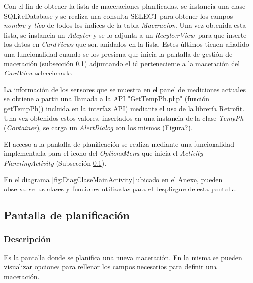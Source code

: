                Con el fin de obtener la lista de maceraciones planificadas, se instancia una clase SQLiteDatabase y se realiza una consulta SELECT para obtener los campos \textit{nombre} y \textit{tipo} de todos los índices de la tabla \textit{Maceracion}. Una vez obtenida esta lista, se instancia un \textit{Adapter} y se lo adjunta a un \textit{RecylcerView}, para que inserte los datos en \textit{CardViews} que son anidados en la lista. Estos últimos tienen añadido una funcionalidad cuando se los presiona que inicia la pantalla de gestión de maceración (subsección \ref{DescripPantallaPlanificación}) adjuntando el id perteneciente a la maceración del \textit{CardView} seleccionado.
                
                \par La información de los sensores que se muestra en el panel de mediciones actuales se obtiene a partir una llamada a la API "GetTempPh.php" (función getTempPh() incluida en la interfaz API) mediante el uso de la librería Retrofit. Una vez obtenidos estos valores, insertados en una instancia de la clase \textit{TempPh} (\textit{Container}), se carga un \textit{AlertDialog} con los mismos (Figura?).
                
                \par El acceso a la pantalla de planificación se realiza mediante una funcionalidad implementada para el icono del \textit{OptionsMenu} que inicia el \textit{Activity PlanningActivity} (Subsección \ref{DescripPantallaPlanificación}).
                
                \par En el diagrama \ref{fig:DiagClaseMainActivity} ubicado en el Anexo, pueden observarse las clases y funciones utilizadas para el despliegue de esta pantalla.
                
                
                
        \subsection{Pantalla de planificación}
        \label{DescripPantallaPlanificación}
        \subsubsection{Descripción}
                \par Es la pantalla donde se planifica una nueva maceración. En la misma se pueden visualizar opciones para rellenar los campos necesarios para definir una maceración.
                
